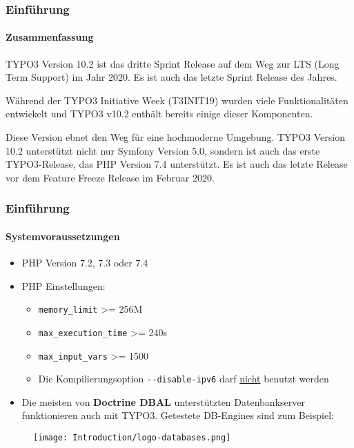 \begin{frame}[fragile]
	\frametitle{Einführung}
	\framesubtitle{Zusammenfassung}

	\small
		TYPO3 Version 10.2 ist das dritte Sprint Release auf dem Weg zur LTS (Long Term 
		Support) im Jahr 2020. Es ist auch das letzte Sprint Release des Jahres.

		\vspace{0.2cm}

		Während der TYPO3 Initiative Week (T3INIT19) wurden viele Funktionalitäten entwickelt
		und TYPO3 v10.2 enthält bereits einige dieser Komponenten.

		\vspace{0.2cm}

		Diese Version ebnet den Weg für eine hochmoderne Umgebung. TYPO3 Version 10.2 unterstützt nicht
		nur Symfony Version 5.0, sondern ist auch das erste TYPO3-Release, das PHP Version 7.4
		unterstützt. Es ist auch das letzte Release vor dem Feature Freeze Release
		im Februar 2020.

	\normalsize

\end{frame}


\begin{frame}[fragile]
	\frametitle{Einführung}
	\framesubtitle{Systemvoraussetzungen}

	\begin{itemize}
		\item PHP Version 7.2, 7.3 oder 7.4
		\item PHP Einstellungen:

			\begin{itemize}
				\item \texttt{memory\_limit} >= 256M
				\item \texttt{max\_execution\_time} >= 240s
				\item \texttt{max\_input\_vars} >= 1500
				\item Die Kompilierungsoption \texttt{-}\texttt{-disable-ipv6} darf \underline{nicht} benutzt werden
			\end{itemize}

		\item Die meisten von \textbf{Doctrine DBAL} unterstützten Datenbankserver funktionieren auch mit TYPO3.
			Getestete DB-Engines sind zum Beispiel:
	\end{itemize}

	\begin{figure}
		\texttt{[image: Introduction/logo-databases.png]}
	\end{figure}

\end{frame}

